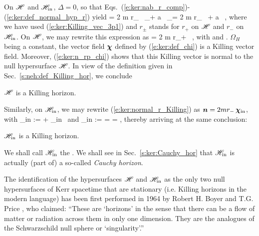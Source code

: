 On $\mathscr{H}$ and $\mathscr{H}_{\rm in}$, $\Delta=0$, so that
Eqs.~(\ref{e:ker:nab_r_comp})-(\ref{e:ker:def_normal_hyp_r})
yield
\be \label{e:ker:normal_r_Killing}
     = 2 m r_{\pm} \, \wpar_\ti + a \, \wpar_\tph = 2 m r_{\pm} \, \w{\xi}
        + a \, \w{\eta} ,
\ee
where we have used (\ref{e:ker:Killing_vec_3p1}) and $r_{\pm}$ stands for
$r_+$ on $\mathscr{H}$ and $r_-$ on $\mathscr{H}_{\rm in}$.
On $\mathscr{H}$, we may rewrite this expression as
\be \label{e:ker:n_rp_chi}
     = 2 m r_+ \, \w{\chi} ,
\ee
with
\be \label{e:ker:def_chi}
\ee
and
\be \label{e:ker:def_OmegaH}
    .
\ee
$\Omega_H$ being a constant, the vector field $\bm{\chi}$ defined by
(\ref{e:ker:def_chi}) is a Killing vector field. Moreover, (\ref{e:ker:n_rp_chi})
shows that this Killing vector is normal to the null hypersurface $\mathscr{H}$.
In view of the definition given in Sec.~\ref{s:neh:def_Killing_hor}, we
conclude
\begin{prop}
$\mathscr{H}$ is a Killing horizon.
\end{prop}

Similarly, on $\mathscr{H}_{\rm in}$, we may rewrite (\ref{e:ker:normal_r_Killing})
as $\bm{n} = 2 m r_- \, \bm{\chi}_{\rm in}$, with
\be \label{e:ker:def_chi_in}
    \w{\chi}_{\rm in} := \w{\xi} + \Omega_{\rm in} \, \w{\eta}
\ee
and
\be \label{e:ker:def_Omega_in}
    \Omega_{\rm in} :=  = 
        =  ,
\ee
thereby arriving at the same conclusion:
\begin{prop}
$\mathscr{H}_{\rm in}$ is a Killing horizon.
\end{prop}
We shall call $\mathscr{H}_{\rm in}$ the . We shall see in Sec.~\ref{s:ker:Cauchy_hor} that $\mathscr{H}_{\rm in}$
is actually (part of) a so-called \emph{Cauchy horizon}.

\begin{hist}
The identification of the hypersurfaces $\mathscr{H}$ and $\mathscr{H}_{\rm in}$
as the only two null hypersurfaces of Kerr spacetime that are stationary
(i.e. Killing horizons in the modern language) has been first performed in
1964 by Robert H. Boyer
and T.G. Price \cite{BoyerP65}, who claimed: ``These are `horizons'
in the sense that there can be a flow of matter or radiation across them in only one dimension. They are the analogues of the Schwarzschild null sphere or `singularity'.''
\end{hist}

